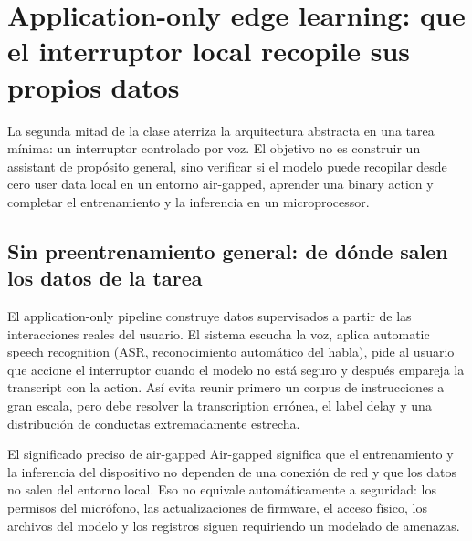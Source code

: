 \section{Application-only edge learning: que el interruptor local recopile sus propios datos}

La segunda mitad de la clase aterriza la arquitectura abstracta en una tarea mínima: un interruptor controlado por voz. El objetivo no es construir un assistant de propósito general, sino verificar si el modelo puede recopilar desde cero user data local en un entorno air-gapped, aprender una binary action y completar el entrenamiento y la inferencia en un microprocessor.

\subsection{Sin preentrenamiento general: de dónde salen los datos de la tarea}

El application-only pipeline construye datos supervisados a partir de las interacciones reales del usuario. El sistema escucha la voz, aplica automatic speech recognition (ASR, reconocimiento automático del habla), pide al usuario que accione el interruptor cuando el modelo no está seguro y después empareja la transcript con la action. Así evita reunir primero un corpus de instrucciones a gran escala, pero debe resolver la transcription errónea, el label delay y una distribución de conductas extremadamente estrecha.


\begin{importantbox}{El significado preciso de air-gapped}
Air-gapped significa que el entrenamiento y la inferencia del dispositivo no dependen de una conexión de red y que los datos no salen del entorno local. Eso no equivale automáticamente a seguridad: los permisos del micrófono, las actualizaciones de firmware, el acceso físico, los archivos del modelo y los registros siguen requiriendo un modelado de amenazas.
\end{importantbox}


